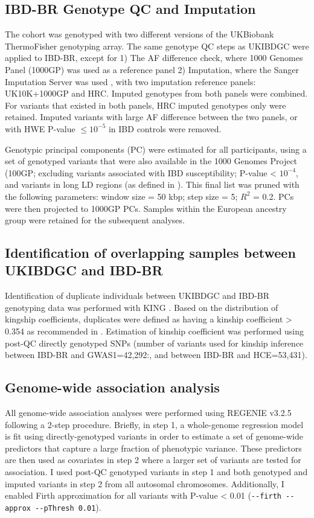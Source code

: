 \subsection{IBD-BR Genotype QC and Imputation}
The cohort was genotyped with two different versions of the UKBiobank ThermoFisher genotyping array. The same genotype QC steps as UKIBDGC were applied to IBD-BR, except for 1) The AF difference check, where 1000 Genomes Panel (1000GP) was used as a reference panel 2) Imputation, where the Sanger Imputation Server was used \cite{1000gp}, with two imputation reference panels: UK10K+1000GP and HRC. Imputed genotypes from both panels were combined. For variants that existed in both panels, HRC imputed genotypes only were retained. Imputed variants with large AF difference between the two panels, or with HWE P-value $ \leq 10^{-5}$ in IBD controls  were removed.

Genotypic principal components (PC) were estimated for all participants, using a set of genotyped variants that were also available in the 1000 Genomes Project (100GP; excluding variants associated with IBD susceptibility; P-value < $10^{-4}$, and variants in long LD regions (as defined in \cite{plink_high_ld}). This final list was pruned with the following parameters: window size = 50 kbp; step size = 5; $R^{2}$ = 0.2. PCs were then projected to 1000GP PCs. Samples within the European ancestry group were retained for the subsequent analyses. 

\subsection{Identification of overlapping samples between UKIBDGC and IBD-BR}
Identification of duplicate individuals between UKIBDGC and IBD-BR genotyping data was performed with KING \cite{king-software}. Based on the distribution of kingship coefficients, duplicates were defined as having a kinship coefficient > 0.354 as recommended in \cite{king-software}. Estimation of kinship coefficient was performed using post-QC directly genotyped SNPs (number of variants used for kinship inference between IBD-BR and GWAS1=42,292:, and between IBD-BR and HCE=53,431).

\subsection{Genome-wide association analysis}
All genome-wide association analyses were performed using REGENIE v3.2.5 \cite{Mbatchou2021-qm} following a 2-step procedure. Briefly, in step 1, a whole-genome regression model is fit using directly-genotyped variants in order to estimate a set of genome-wide predictors that capture a large fraction of phenotypic variance. These predictors are then used as covariates in step 2 where a larger set of variants are tested for association.
I used post-QC genotyped variants in step 1 and both genotyped and imputed variants in step 2 from all autosomal chromosomes. Additionally, I enabled Firth approximation for all variants with P-value < 0.01 (\Verb+--firth --approx --pThresh 0.01+).

